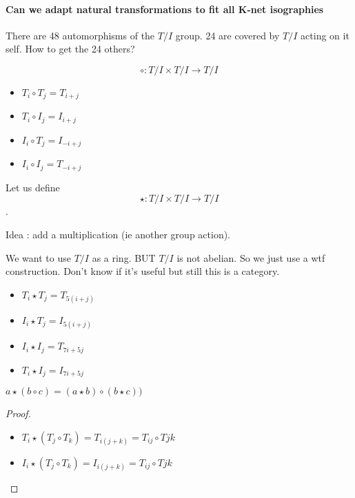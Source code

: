 
\paragraph{Can we adapt natural transformations to fit all K-net isographies}
There are 48 automorphisms of the $T/I$ group. 24 are covered by $T/I$ acting on it self. How to get the 24 others?

$$\circ : T/I \times T/I \rightarrow T/I$$

\begin{itemize}
    \item $T_i \circ T_j = T_{i + j}$
    \item $T_i \circ I_j = I_{i + j}$
    \item $I_i \circ T_j = I_{-i + j}$
    \item $I_i \circ I_j = T_{-i + j}$
\end{itemize}

Let us define
$$\star : T/I \times T/I \rightarrow T/I$$.

Idea : add a multiplication (ie another group action).

We want to use $T/I$ as a ring. BUT $T/I$ is not abelian. So we just use a wtf construction. Don't know if it's useful but still this is a category.
\begin{itemize}
    \item $T_i \star T_j = T_{5(i + j)}$
    \item $I_i \star T_j = I_{5(i + j)}$
    \item $I_i \star I_j = T_{7i + 5j}$
    \item $T_i \star I_j = I_{7i + 5j}$
\end{itemize}



\begin{prop}
    $a \star (b \circ c) = (a \star b) \circ (b \star c)) $
\end{prop}
\begin{proof}
    \begin{itemize}
        \item $T_i \star (T_j \circ T_k) = T_{i(j+k)} = T_{ij}\circ T{jk}$
        \item $I_i \star (T_j \circ T_k) = I_{i(j+k)} = T_{ij}\circ T{jk}$
    \end{itemize}
\end{proof}
